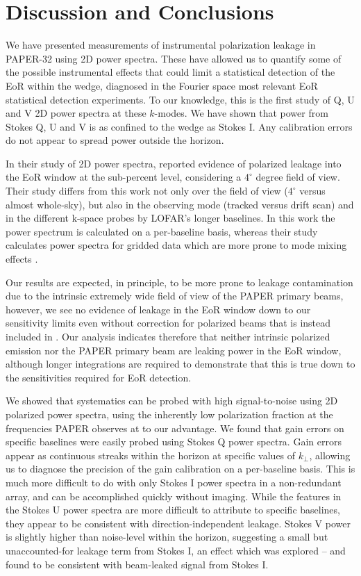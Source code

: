 \section{Discussion and Conclusions}
\label{sec:psa32_disc}

We have presented measurements of instrumental polarization leakage in PAPER-32 using 2D power spectra. These have allowed us to quantify some of the possible instrumental effects that could limit a statistical detection of the EoR within the wedge, diagnosed in the Fourier space most relevant EoR statistical detection experiments. To our knowledge, this is the first study of Q, U and V 2D power spectra at these $k$-modes. We have shown that power from Stokes Q, U and V is as confined to the wedge as Stokes I. Any calibration errors do not appear to spread power outside the horizon. 

In their study of 2D power spectra, \citet{Asad.15} reported evidence of polarized leakage into the EoR window at the sub-percent level, considering a $4^\circ$ degree field of view. Their study differs from this work not only over the field of view ($4^\circ$ versus almost whole-sky), but also in the observing mode (tracked versus drift scan) and in the different k-space probes by LOFAR's longer baselines. In this work the power spectrum is calculated on a per-baseline basis, whereas their study calculates power spectra for gridded data which are more prone to mode mixing effects \citep{Hazelton.13}.

Our results are expected, in principle, to be more prone to leakage contamination due to the intrinsic extremely wide field of view of the PAPER primary beams, however, we see no evidence of leakage in the EoR window down to our sensitivity limits even without correction for polarized beams that is instead included in \cite{Asad.15}. Our analysis indicates therefore that neither intrinsic polarized emission nor the PAPER primary beam are leaking power in the EoR window, although longer integrations are required to demonstrate that this is true down to the sensitivities required for EoR detection. 

We showed that systematics can be probed with high signal-to-noise using 2D polarized power spectra, using the inherently low polarization fraction at the frequencies PAPER observes at to our advantage. We found that gain errors on specific baselines were easily probed using Stokes Q power spectra. Gain errors appear as continuous streaks within the horizon at specific values of $k_{\perp}$, allowing us to diagnose the precision of the gain calibration on a per-baseline basis. This is much more difficult to do with only Stokes I power spectra in a non-redundant array, and can be accomplished quickly without imaging. While the features in the Stokes U power spectra are more difficult to attribute to specific baselines, they appear to be consistent with direction-independent leakage. 
Stokes V power is slightly higher than noise-level within the horizon, suggesting a small but unaccounted-for leakage term from Stokes I, an effect which was explored \cite{Nunhokee.17} -- and found to be consistent with beam-leaked signal from Stokes I.